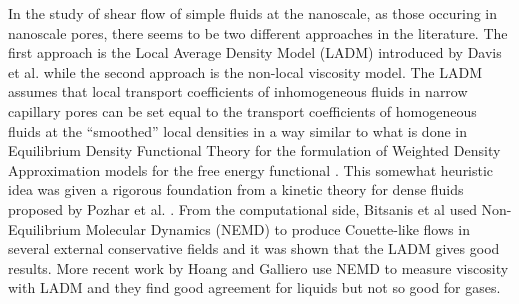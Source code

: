 \documentclass[a4paper,openright,12pt]{book}
\begin{document}
In the study of shear flow of simple fluids at the nanoscale, as those
occuring  in  nanoscale  pores,  there   seems  to  be  two  different
approaches in the literature.  The first approach is the Local Average
Density Model  (LADM) introduced by Davis  et al.  \cite{Bitsanis1987}
while the second  approach is the non-local viscosity  model. The LADM
assumes that  local transport coefficients of  inhomogeneous fluids in
narrow capillary pores can be  set equal to the transport coefficients
of homogeneous  fluids at  the ``smoothed'' local  densities in  a way
similar to what  is done in Equilibrium Density  Functional Theory for
the formulation of Weighted Density  Approximation models for the free
energy functional  \cite{Tarazona2008}.  This somewhat  heuristic idea
was given a rigorous foundation from a kinetic theory for dense fluids
proposed by Pozhar et al.  \cite{Pozhar1991a}.  From the computational
side,   Bitsanis  et   al  \cite{Bitsanis1987}   used  Non-Equilibrium
Molecular  Dynamics (NEMD)  to produce  Couette-like flows  in several
external conservative fields and it was shown that the LADM gives good
results.    More     recent    work    by    Hoang     and    Galliero
\cite{Hoang2012a,Hoang2012b,Hoang2013} use  NEMD to  measure viscosity
with LADM and they find good agreement for liquids but not so good for
gases.
\end{document}

